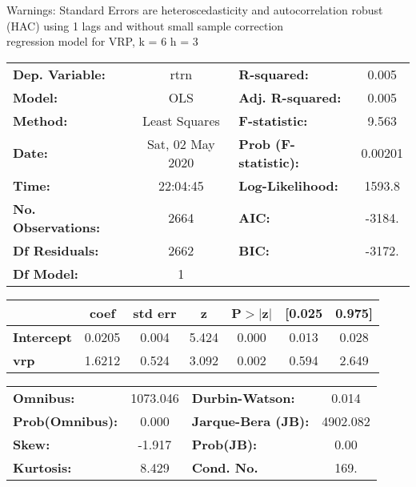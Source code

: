Warnings: \newline
 [1] Standard Errors are heteroscedasticity and autocorrelation robust (HAC) using 1 lags and without small sample correction\\ 

regression model for VRP, k = 6 h = 3\begin{center}
\begin{tabular}{lclc}
\toprule
\textbf{Dep. Variable:}    &       rtrn       & \textbf{  R-squared:         } &     0.005   \\
\textbf{Model:}            &       OLS        & \textbf{  Adj. R-squared:    } &     0.005   \\
\textbf{Method:}           &  Least Squares   & \textbf{  F-statistic:       } &     9.563   \\
\textbf{Date:}             & Sat, 02 May 2020 & \textbf{  Prob (F-statistic):} &  0.00201    \\
\textbf{Time:}             &     22:04:45     & \textbf{  Log-Likelihood:    } &    1593.8   \\
\textbf{No. Observations:} &        2664      & \textbf{  AIC:               } &    -3184.   \\
\textbf{Df Residuals:}     &        2662      & \textbf{  BIC:               } &    -3172.   \\
\textbf{Df Model:}         &           1      & \textbf{                     } &             \\
\bottomrule
\end{tabular}
\begin{tabular}{lcccccc}
                   & \textbf{coef} & \textbf{std err} & \textbf{z} & \textbf{P$> |$z$|$} & \textbf{[0.025} & \textbf{0.975]}  \\
\midrule
\textbf{Intercept} &       0.0205  &        0.004     &     5.424  &         0.000        &        0.013    &        0.028     \\
\textbf{vrp}       &       1.6212  &        0.524     &     3.092  &         0.002        &        0.594    &        2.649     \\
\bottomrule
\end{tabular}
\begin{tabular}{lclc}
\textbf{Omnibus:}       & 1073.046 & \textbf{  Durbin-Watson:     } &    0.014  \\
\textbf{Prob(Omnibus):} &   0.000  & \textbf{  Jarque-Bera (JB):  } & 4902.082  \\
\textbf{Skew:}          &  -1.917  & \textbf{  Prob(JB):          } &     0.00  \\
\textbf{Kurtosis:}      &   8.429  & \textbf{  Cond. No.          } &     169.  \\
\bottomrule
\end{tabular}
\end{center}

